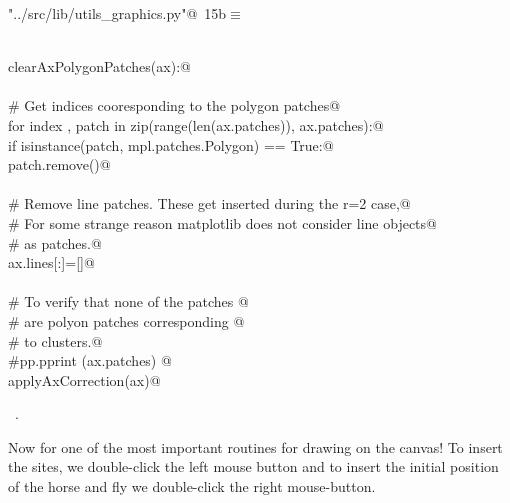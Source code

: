 \documentclass[11.5pt]{report}
\begin{document}
\begin{flushleft} \small\label{scrap4}\raggedright\small
{} \verb@"../src/lib/utils_graphics.py"@\nobreak\ {\footnotesize {15b}}$\equiv$
\vspace{-1ex}
\begin{list}{}{} \item
\mbox{}\verb@@\\
\mbox{}\verb@def clearAxPolygonPatches(ax):@\\
\mbox{}\verb@@\\
\mbox{}\verb@    # Get indices cooresponding to the polygon patches@\\
\mbox{}\verb@    for index , patch in zip(range(len(ax.patches)), ax.patches):@\\
\mbox{}\verb@        if isinstance(patch, mpl.patches.Polygon) == True:@\\
\mbox{}\verb@            patch.remove()@\\
\mbox{}\verb@@\\
\mbox{}\verb@    # Remove line patches. These get inserted during the r=2 case,@\\
\mbox{}\verb@    # For some strange reason matplotlib does not consider line objects@\\
\mbox{}\verb@    # as patches.@\\
\mbox{}\verb@    ax.lines[:]=[]@\\
\mbox{}\verb@@\\
\mbox{}\verb@    # To verify that none of the patches @\\
\mbox{}\verb@    # are polyon patches corresponding @\\
\mbox{}\verb@    # to clusters.@\\
\mbox{}\verb@    #pp.pprint (ax.patches) @\\
\mbox{}\verb@    applyAxCorrection(ax)@\\
\mbox{}\verb@@{\NWsep}
\end{list}
\vspace{-1.5ex}
\footnotesize
\begin{list}{}{\setlength{\itemsep}{-\parsep}\setlength{\itemindent}{-\leftmargin}}
\item \NWtxtFileDefBy\ .

\item{}
\end{list}
\vspace{4ex}
\end{flushleft}
\newchunk Now for one of the most important routines for drawing on the canvas! 
To insert the sites, we double-click the left mouse button and to insert the 
initial position of the horse and fly we double-click the right mouse-button. 
\end{document}
